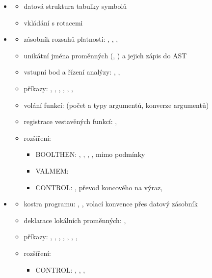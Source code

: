 \documentclass[11pt,a4paper]{article}
\begin{document}
\begin{itemize}
  \item {}
  \begin{itemize}
    \item datová struktura tabulky symbolů
    \item vkládání s rotacemi
  \end{itemize}

  \item {}
  \begin{itemize}
    \item zásobník rozsahů platnosti: , , , 
    \item unikátní jména proměnných (, ) a jejich zápis do AST
    \item vstupní bod a řízení analýzy: , , 
    \item příkazy: , , , , , , 
    \item volání funkcí:  (počet a typy argumentů, konverze argumentů)
    \item registrace vestavěných funkcí: , 
    \item rozšíření:
    \begin{itemize}
      \item BOOLTHEN: \id{&&}, \id{||}, \id{!}, ,  mimo podmínky
      \item VALMEM: 
      \item CONTROL: , převod koncového  na výraz, 
    \end{itemize}
  \end{itemize}

  \item {}
  \begin{itemize}
    \item kostra programu: , , volací konvence přes datový zásobník
    \item deklarace lokálních proměnných: , 
    \item příkazy: , , , , , , , 
    \item rozšíření:
    \begin{itemize}
      \item CONTROL: , , , 
    \end{itemize}
  \end{itemize}
\end{itemize}
\end{document}
